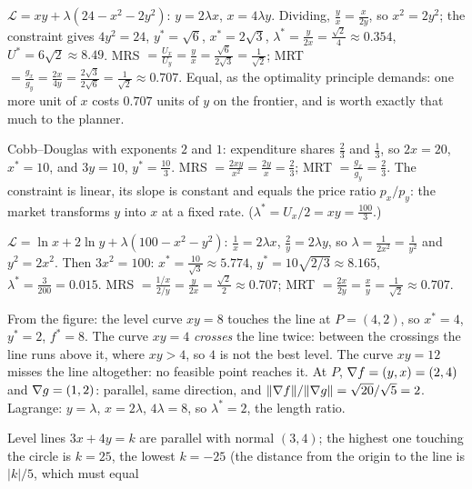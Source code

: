\begin{solutions}
  \item $\mathcal{L}=xy+\lambda(24-x^{2}-2y^{2})$: $y=2\lambda x$,
        $x=4\lambda y$. Dividing, $\tfrac{y}{x}=\tfrac{x}{2y}$, so
        $x^{2}=2y^{2}$; the constraint gives $4y^{2}=24$, $y^*=\sqrt6$,
        $x^*=2\sqrt3$, $\lambda^*=\tfrac{y}{2x}=\tfrac{\sqrt2}{4}\approx0.354$,
        $U^*=6\sqrt2\approx8.49$. MRS $=\tfrac{U_x}{U_y}=\tfrac{y}{x}
        =\tfrac{\sqrt6}{2\sqrt3}=\tfrac1{\sqrt2}$; MRT $=\tfrac{g_x}{g_y}
        =\tfrac{2x}{4y}=\tfrac{2\sqrt3}{2\sqrt6}=\tfrac1{\sqrt2}\approx0.707$.
        Equal, as the optimality principle demands: one more unit of $x$
        costs $0.707$ units of $y$ on the frontier, and is worth exactly
        that much to the planner.
  \item Cobb--Douglas with exponents $2$ and $1$: expenditure shares
        $\tfrac23$ and $\tfrac13$, so $2x=20$, $x^*=10$, and $3y=10$,
        $y^*=\tfrac{10}{3}$. MRS $=\tfrac{2xy}{x^{2}}=\tfrac{2y}{x}
        =\tfrac{2}{3}$; MRT $=\tfrac{g_x}{g_y}=\tfrac23$. The constraint is
        linear, its slope is constant and equals the price ratio
        $p_x/p_y$: the market transforms $y$ into $x$ at a fixed rate.
        ($\lambda^*=U_x/2=xy=\tfrac{100}{3}$.)
  \item $\mathcal{L}=\ln x+2\ln y+\lambda(100-x^{2}-y^{2})$:
        $\tfrac1x=2\lambda x$, $\tfrac2y=2\lambda y$, so
        $\lambda=\tfrac{1}{2x^{2}}=\tfrac{1}{y^{2}}$ and $y^{2}=2x^{2}$.
        Then $3x^{2}=100$: $x^*=\tfrac{10}{\sqrt3}\approx5.774$,
        $y^*=10\sqrt{2/3}\approx8.165$, $\lambda^*=\tfrac{3}{200}=0.015$.
        MRS $=\tfrac{1/x}{2/y}=\tfrac{y}{2x}=\tfrac{\sqrt2}{2}\approx0.707$;
        MRT $=\tfrac{2x}{2y}=\tfrac{x}{y}=\tfrac1{\sqrt2}\approx0.707$.
        \checkmark
  \item From the figure: the level curve $xy=8$ touches the line at
        $P=(4,2)$, so $x^*=4$, $y^*=2$, $f^*=8$. The curve $xy=4$
        \emph{crosses} the line twice: between the crossings the line runs
        above it, where $xy>4$, so $4$ is not the best level. The curve
        $xy=12$ misses the line altogether: no feasible point reaches it.
        At $P$, $\nabla f=(y,x)=(2,4)$ and $\nabla g=(1,2)$: parallel, same
        direction, and $\|\nabla f\|/\|\nabla g\|=\sqrt{20}/\sqrt5=2$.
        Lagrange: $y=\lambda$, $x=2\lambda$, $4\lambda=8$, so $\lambda^*=2$,
        the length ratio.
  \item Level lines $3x+4y=k$ are parallel with normal $(3,4)$; the
        highest one touching the circle is $k=25$, the lowest $k=-25$ (the
        distance from the origin to the line is $|k|/5$, which must equal

\end{solutions}
